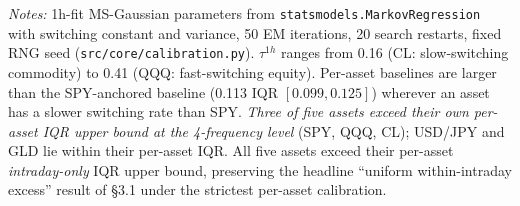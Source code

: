 \documentclass[preprint,12pt,authoryear]{elsarticle}
\begin{document}
\begin{table}[!htbp]
\centering
\small
\setlength{\tabcolsep}{4pt}
\caption{Per-asset full ML calibration baseline (2026 episode only; the 2022 OOS episode is excluded because QQQ and CL 2022 5m bars are absent from this revision round). Each asset's MS-Gaussian DGP is independently fit on its own 1h log returns; the resulting calibrated 5m DGP is run through the canonical pipeline $n{=}200$ times. Empirical ARI values from Table~1.}
\label{tab:per_asset_baseline}
\par\medskip
{\footnotesize\justifying
\textit{Notes:} 1h-fit MS-Gaussian parameters from \texttt{statsmodels.MarkovRegression} with switching constant and variance, 50 EM iterations, 20 search restarts, fixed RNG seed (\texttt{src/core/calibration.py}). $\tau^{1h}$ ranges from 0.16 (CL: slow-switching commodity) to 0.41 (QQQ: fast-switching equity). Per-asset baselines are larger than the SPY-anchored baseline (0.113 IQR $[0.099, 0.125]$) wherever an asset has a slower switching rate than SPY. \emph{Three of five assets exceed their own per-asset IQR upper bound at the 4-frequency level} (SPY, QQQ, CL); USD/JPY and GLD lie within their per-asset IQR. All five assets exceed their per-asset \emph{intraday-only} IQR upper bound, preserving the headline ``uniform within-intraday excess'' result of \S{}3.1 under the strictest per-asset calibration.
\par}
\end{table}
\end{document}
